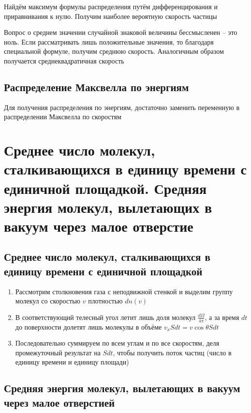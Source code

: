 \documentclass[a4paper, 14pt]{article}
\begin{document}
    Найдём максимум формулы распределения путём дифференцирования и приравнивания к нулю.
    Получим наиболее вероятную скорость частицы

    Вопрос о среднем значении случайной знаковой величины бессмысленен -- это ноль.
    Если рассматривать лишь положительные значения, то благодаря специальной формуле, получим среднюю скорость.
    Аналогичным образом получается среднеквадратичная скорость

    \subsection{Распределение Максвелла по энергиям}

    Для получения распределения по энергиям, достаточно заменить переменную в распределении Максвелла по скоростям

    \section{Среднее число молекул, сталкивающихся в единицу времени с единичной площадкой.
    Средняя энергия молекул, вылетающих в вакуум через малое отверстие}

    \subsection{Среднее число молекул, сталкивающихся в единицу времени с единичной площадкой}

    \begin{enumerate}
        \item Рассмотрим столкновения газа с неподвижной стенкой и выделим группу молекул со скоростью $v$ плотностью
        $dn(v)$
        \item В соответствующий телесный угол летит лишь доля молекул $\frac{d\Omega}{4\pi}$, а за время $dt$ до
        поверхности долетят лишь молекулы в объёме $v_x Sdt = v \cos \theta Sdt$
        \item Последовательно суммируем по всем углам и по все скоростям, деля промежуточный результат на $Sdt$,
        чтобы получить поток частиц (число в единицу времени и единицу площади)
    \end{enumerate}

    \subsection{Средняя энергия молекул, вылетающих в вакуум через малое отверстией}
\end{document}
